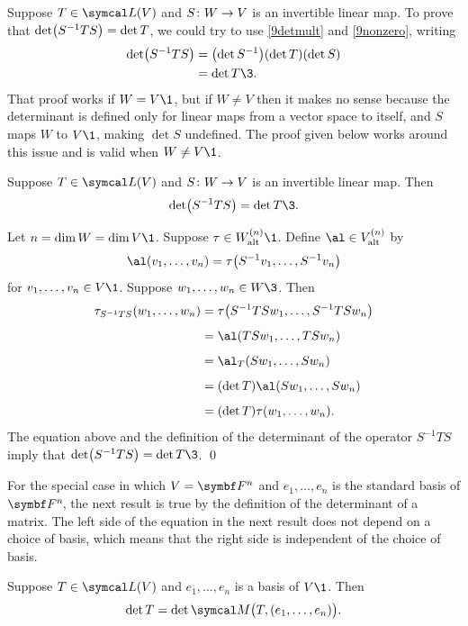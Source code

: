 Suppose $T \in \L(V)$ and $\fun S W V$ is an invertible linear map. To prove that $\det\paren[\big]{ S^{-1} T S } = \det T$, we could try to use \ref{9detmult} and \ref{9nonzero}, writing
\begin{align*}
\det\paren[\big]{ S^{-1} T S }&= \paren[\big]{ \det S^{-1} } (\det T) (\det S) \\
&= \det T\3.
\end{align*}
That proof works if $W = V\1$, but if $W \ne V$ then it makes no sense because the determinant is defined only for linear maps from a vector space to itself, and $S$ maps $W$ to $V\1$, making $\det S$ undefined. The proof given below works around this issue and is valid when $W \ne V\1$.

{Suppose $T \in \L(V)$ and $\fun S W V$ is an invertible linear map. Then
\[
\det\paren[\big]{ S^{-1} T S } = \det T\3.
\]}

\proof
Let $n = \dim W = \dim V\1$. Suppose $\tau \in W_{\text{alt}}^{(n)}\1$. Define $\al \in V^{(n)}_{\text{alt}}$ by
\[
\al(v_1, \ldots, v_n) = \tau\paren[\big]{S^{-1}v_1, \ldots, S^{-1}v_n}
\]
for $v_1, \ldots, v_n \in V\1$. Suppose $w_1, \ldots, w_n \in W\3$. Then
\begin{align*}
\tau_{S^{-1} T S}( w_1, \ldots, w_n) &= \tau\paren[\big]{ S^{-1}TS w_1, \ldots, S^{-1} T S w_n} \\[5bp]
&= \al( TSw_1, \ldots, TSw_n) \\[5bp]
&= \al_T( Sw_1, \ldots, Sw_n) \\[5bp]
&= (\det T) \al(Sw_1, \ldots, Sw_n) \\[5bp]
&= (\det T) \tau(w_1, \ldots, w_n).
\end{align*}
The equation above and the definition of the determinant of the operator $S^{-1} T S $ imply that
$\det\paren[\big]{ S^{-1} T S } = \det T\3$.
\qed

For the special case in which $V = \F n$ and $e_1, \ldots, e_n$ is the standard basis of $\FF n$, the next result is true by the definition of the determinant of a matrix. The left side of the equation in the next result does not depend on a choice of basis, which means that the right side is independent of the choice of basis.

{Suppose $T \in \L(V)$ and $e_1, \ldots, e_n$ is a basis of $V\1$. Then
\[
\det T = \det \M\paren[\big]{T, (e_1, \ldots, e_n) }.
\]}

